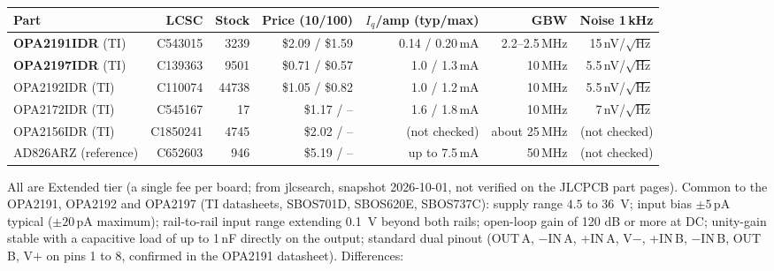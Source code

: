 \documentclass[11pt,a4paper]{article}
\begin{document}
\begin{center}
\scriptsize
\begin{tabular}{@{}lrrrrrr@{}}
\toprule
Part & LCSC & Stock & Price (10/100) & $I_q$/amp (typ/max) & GBW & Noise 1\,kHz \\
\midrule
\textbf{OPA2191IDR} (TI) & C543015  & 3239  & \$2.09 / \$1.59 & 0.14 / 0.20\,mA & 2.2--2.5\,MHz & 15\,nV/$\sqrt{\mathrm{Hz}}$ \\
\textbf{OPA2197IDR} (TI) & C139363  & 9501  & \$0.71 / \$0.57 & 1.0 / 1.3\,mA   & 10\,MHz & 5.5\,nV/$\sqrt{\mathrm{Hz}}$ \\
OPA2192IDR (TI)          & C110074  & 44738 & \$1.05 / \$0.82 & 1.0 / 1.2\,mA   & 10\,MHz & 5.5\,nV/$\sqrt{\mathrm{Hz}}$ \\
OPA2172IDR (TI)          & C545167  & 17    & \$1.17 / --     & 1.6 / 1.8\,mA   & 10\,MHz & 7\,nV/$\sqrt{\mathrm{Hz}}$ \\
OPA2156IDR (TI)          & C1850241 & 4745  & \$2.02 / --     & (not checked)   & about 25\,MHz & (not checked) \\
AD826ARZ (reference)     & C652603  & 946   & \$5.19 / --     & up to 7.5\,mA   & 50\,MHz & (not checked) \\
\bottomrule
\end{tabular}
\end{center}
All are Extended tier (a single fee per board; from jlcsearch, snapshot 2026-10-01, not
verified on the JLCPCB part pages).  Common to the OPA2191, OPA2192 and OPA2197 (TI datasheets,
SBOS701D, SBOS620E, SBOS737C): supply range $4.5$ to \SI{36}{\volt}; input bias
$\pm5$\,pA typical ($\pm20$\,pA maximum); rail-to-rail input range extending \SI{0.1}{\volt}
beyond both rails; open-loop gain of 120 dB or more at DC; unity-gain stable with a capacitive
load of up to 1\,nF directly on the output; standard dual pinout (OUT\,A, $-$IN\,A, +IN\,A, V$-$,
+IN\,B, $-$IN\,B, OUT\,B, V$+$ on pins 1 to 8, confirmed in the OPA2191 datasheet).  Differences:
\end{document}
